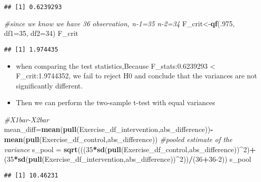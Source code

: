 \documentclass[]{article}
\newenvironment{Shaded}{\begin{snugshade}}{\end{snugshade}}
\newcommand{\CommentTok}[1]{\textcolor[rgb]{0.56,0.35,0.01}{\textit{#1}}}
\newcommand{\DataTypeTok}[1]{\textcolor[rgb]{0.13,0.29,0.53}{#1}}
\newcommand{\DecValTok}[1]{\textcolor[rgb]{0.00,0.00,0.81}{#1}}
\newcommand{\KeywordTok}[1]{\textcolor[rgb]{0.13,0.29,0.53}{\textbf{#1}}}
\newcommand{\NormalTok}[1]{#1}
\newcommand{\OperatorTok}[1]{\textcolor[rgb]{0.81,0.36,0.00}{\textbf{#1}}}
\newcommand{\StringTok}[1]{\textcolor[rgb]{0.31,0.60,0.02}{#1}}
\begin{document}
\begin{verbatim}
## [1] 0.6239293
\end{verbatim}

\begin{Shaded}
\begin{Highlighting}[]
\CommentTok{#since we know we have 36 observation, n-1=35 n-2=34}
\NormalTok{F_crit<-}\KeywordTok{qf}\NormalTok{(.}\DecValTok{975}\NormalTok{, }\DataTypeTok{df1=}\DecValTok{35}\NormalTok{, }\DataTypeTok{df2=}\DecValTok{34}\NormalTok{) }
\NormalTok{F_crit}
\end{Highlighting}
\end{Shaded}

\begin{verbatim}
## [1] 1.974435
\end{verbatim}

\begin{itemize}
\item
  when comparing the test statistics,Because F\_stats:0.6239293
  \textless{} F\_crit:1.9744352, we fail to reject H0 and conclude that
  the variances are not significantly different.
\item
  Then we can perform the two-sample t-test with equal variances
\end{itemize}

\begin{Shaded}
\begin{Highlighting}[]
\CommentTok{#X1bar-X2bar}
\NormalTok{mean_diff=}\KeywordTok{mean}\NormalTok{(}\KeywordTok{pull}\NormalTok{(Exercise_df_intervention,abs_difference))}\OperatorTok{-}\KeywordTok{mean}\NormalTok{(}\KeywordTok{pull}\NormalTok{(Exercise_df_control,abs_difference))}
\CommentTok{#pooled estimate of the variance}
\NormalTok{s_pool =}\StringTok{ }\KeywordTok{sqrt}\NormalTok{(((}\DecValTok{35}\OperatorTok{*}\KeywordTok{sd}\NormalTok{(}\KeywordTok{pull}\NormalTok{(Exercise_df_control,abs_difference))}\OperatorTok{^}\DecValTok{2}\NormalTok{)}\OperatorTok{+}\NormalTok{(}\DecValTok{35}\OperatorTok{*}\KeywordTok{sd}\NormalTok{(}\KeywordTok{pull}\NormalTok{(Exercise_df_intervention,abs_difference))}\OperatorTok{^}\DecValTok{2}\NormalTok{))}\OperatorTok{/}\NormalTok{(}\DecValTok{36}\OperatorTok{+}\DecValTok{36-2}\NormalTok{))}
\NormalTok{s_pool}
\end{Highlighting}
\end{Shaded}

\begin{verbatim}
## [1] 10.46231
\end{verbatim}
\end{document}
